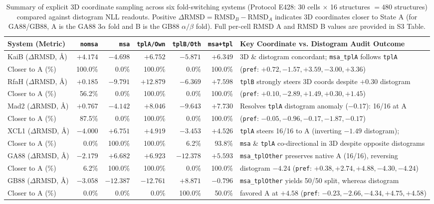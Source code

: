 \documentclass[10pt,a4paper]{article}
\begin{document}
\begin{table}[!ht]
\centering
\caption{Summary of explicit 3D coordinate sampling across six fold-switching systems (Protocol E428: 30 cells $\times$ 16 structures $= 480$ structures) compared against distogram NLL readouts. Positive $\Delta\mathrm{RMSD} = \mathrm{RMSD}_B - \mathrm{RMSD}_A$ indicates 3D coordinates closer to State A (for GA88/GB88, A is the GA88 $3\alpha$ fold and B is the GB88 $\alpha/\beta$ fold). Full per-cell RMSD A and RMSD B values are provided in S3 Table.}
\label{tab:e428_coordinates}
\footnotesize
\begin{tabularx}{\textwidth}{l r r r r r Y}
\toprule
\textbf{System (Metric)} & \textbf{\texttt{nomsa}} & \textbf{\texttt{msa}} & \textbf{\texttt{tplA/Own}} & \textbf{\texttt{tplB/Oth}} & \textbf{\texttt{msa+tpl}} & \textbf{Key Coordinate vs. Distogram Audit Outcome} \\
\midrule
KaiB ($\Delta$RMSD, \AA{}) & $+4.174$ & $-4.698$ & $+6.752$ & $-5.871$ & $+6.349$ & 3D \& distogram concordant; \texttt{msa\_tplA} follows \texttt{tplA} \\
\quad Closer to A (\%) & 100.0\% & 0.0\% & 100.0\% & 0.0\% & 100.0\% & (\texttt{pref}: $+0.72, -1.57, +3.59, -3.00, +3.36$) \\
\midrule
RfaH ($\Delta$RMSD, \AA{}) & $+0.185$ & $-9.791$ & $+12.879$ & $-6.369$ & $+7.598$ & \texttt{tplB} strongly steers 3D coords despite $+0.30$ distogram \\
\quad Closer to A (\%) & 56.2\% & 0.0\% & 100.0\% & 0.0\% & 100.0\% & (\texttt{pref}: $+0.10, -2.89, +1.49, +0.30, +1.45$) \\
\midrule
Mad2 ($\Delta$RMSD, \AA{}) & $+0.767$ & $-4.142$ & $+8.046$ & $-9.643$ & $+7.730$ & Resolves \texttt{tplA} distogram anomaly ($-0.17$): 16/16 at A \\
\quad Closer to A (\%) & 87.5\% & 0.0\% & 100.0\% & 0.0\% & 100.0\% & (\texttt{pref}: $-0.05, -0.96, -0.17, -1.87, -0.17$) \\
\midrule
XCL1 ($\Delta$RMSD, \AA{}) & $-4.000$ & $+6.751$ & $+4.919$ & $-3.453$ & $+4.526$ & \texttt{tplA} steers 16/16 to A (inverting $-1.49$ distogram); \\
\quad Closer to A (\%) & 0.0\% & 100.0\% & 100.0\% & 6.2\% & 93.8\% & \texttt{msa} \& \texttt{tplA} co-directional in 3D despite opposite distograms \\
\midrule
GA88 ($\Delta$RMSD, \AA{}) & $-2.179$ & $+6.682$ & $+6.923$ & $-12.378$ & $+5.593$ & \texttt{msa\_tplOther} preserves native A (16/16), reversing \\
\quad Closer to A (\%) & 6.2\% & 100.0\% & 100.0\% & 0.0\% & 100.0\% & distogram $-4.24$ (\texttt{pref}: $+0.38, +2.74, +4.88, -4.30, -4.24$) \\
\midrule
GB88 ($\Delta$RMSD, \AA{}) & $-3.058$ & $-12.387$ & $-12.761$ & $+8.871$ & $-0.796$ & \texttt{msa\_tplOther} yields 50/50 split, whereas distogram \\
\quad Closer to A (\%) & 0.0\% & 0.0\% & 0.0\% & 100.0\% & 50.0\% & favored A at $+4.58$ (\texttt{pref}: $-0.23, -2.66, -4.34, +4.75, +4.58$) \\
\bottomrule
\end{tabularx}
\end{table}
\end{document}
